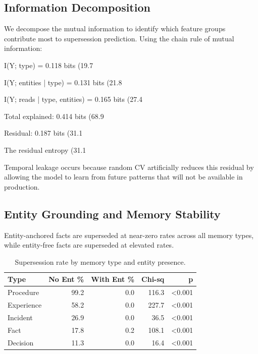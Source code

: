\documentclass[sigconf,nonacm]{acmart}
\begin{document}
\subsection{Information Decomposition}
\label{sec:info-decomp}

We decompose the mutual information to identify which feature groups contribute most to supersession prediction. Using the chain rule of mutual information:

I(Y; type) = 0.118 bits (19.7%

I(Y; entities | type) = 0.131 bits (21.8%

I(Y; reads | type, entities) = 0.165 bits (27.4%

Total explained: 0.414 bits (68.9%

Residual: 0.187 bits (31.1%

The residual entropy (31.1%

Temporal leakage occurs because random CV artificially reduces this residual by allowing the model to learn from future patterns that will not be available in production.

\subsection{Entity Grounding and Memory Stability}
\label{sec:entity}

Entity-anchored facts are superseded at near-zero rates across all memory types, while entity-free facts are superseded at elevated rates.

\begin{table}[h]
\centering
\caption{Supersession rate by memory type and entity presence.}
\begin{tabular}{lrrrr}
\toprule
Type & No Ent \% & With Ent \% & Chi-sq & p \\
\midrule
Procedure & 99.2 & 0.0 & 116.3 & <0.001 \\
Experience & 58.2 & 0.0 & 227.7 & <0.001 \\
Incident & 26.9 & 0.0 & 36.5 & <0.001 \\
Fact & 17.8 & 0.2 & 108.1 & <0.001 \\
Decision & 11.3 & 0.0 & 16.4 & <0.001 \\
\bottomrule
\end{tabular}
\end{table}
\end{document}
